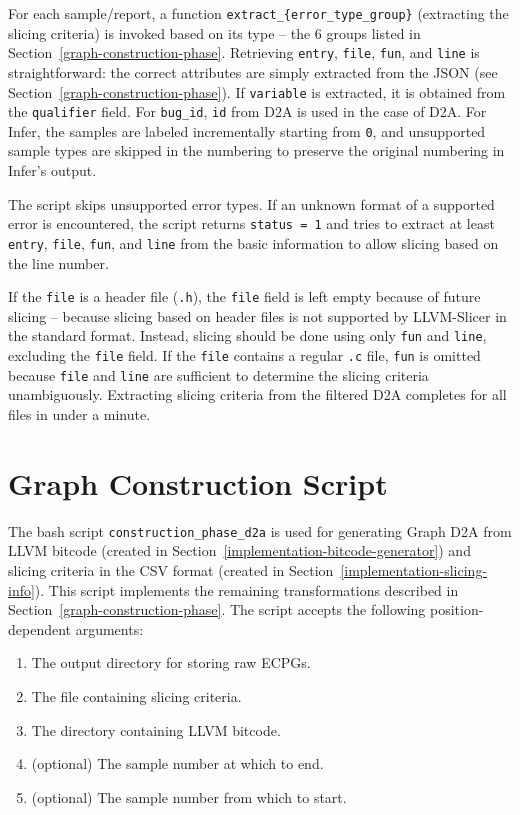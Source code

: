 For each sample/report, a function \texttt{extract\_\{error\_type\_group\}} (extracting the slicing criteria) is invoked based on its type -- the 6 groups listed in Section~\ref{graph-construction-phase}. Retrieving \texttt{entry}, \texttt{file}, \texttt{fun}, and \texttt{line} is straightforward: the correct attributes are simply extracted from the JSON (see Section~\ref{graph-construction-phase}). If \texttt{variable} is extracted, it is obtained from the \texttt{qualifier} field. For \texttt{bug\_id}, \texttt{id} from D2A is used in the case of D2A. For Infer, the samples are labeled incrementally starting from \texttt{0}, and unsupported sample types are skipped in the numbering to preserve the original numbering in Infer's output.

The script skips unsupported error types. If an unknown format of a supported error is encountered, the script returns \texttt{status = 1} and tries to extract at least \texttt{entry}, \texttt{file}, \texttt{fun}, and \texttt{line} from the basic information to allow slicing based on the line number.

If the \texttt{file} is a header file (\texttt{.h}), the \texttt{file} field is left empty because of future slicing -- because slicing based on header files is not supported by LLVM-Slicer in the standard format. Instead, slicing should be done using only \texttt{fun} and \texttt{line}, excluding the \texttt{file} field. If the \texttt{file} contains a regular \texttt{.c} file, \texttt{fun} is omitted because \texttt{file} and \texttt{line} are sufficient to determine the slicing criteria unambiguously. Extracting slicing criteria from the filtered D2A completes for all files in under a minute.


\section{Graph Construction Script}
\label{implementation-graph-construction}
The bash script \texttt{construction\_phase\_d2a} is used for generating Graph D2A from LLVM bitcode (created in Section~\ref{implementation-bitcode-generator}) and slicing criteria in the CSV format (created in Section~\ref{implementation-slicing-info}). This script implements the remaining transformations described in Section~\ref{graph-construction-phase}. The script accepts the following position-dependent arguments:
\begin{enumerate}
    \item The output directory for storing raw ECPGs.
    \item The file containing slicing criteria.
    \item The directory containing LLVM bitcode.
    \item (optional) The sample number at which to end.
    \item (optional) The sample number from which to start.
\end{enumerate}

